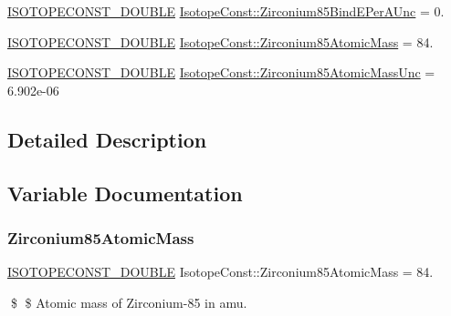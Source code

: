 \begin{DoxyCompactItemize}
\mbox{\hyperlink{group___isotope_const-_macros_ga8f45a7272ce02c0b4c65c44636ed719a}{I\+S\+O\+T\+O\+P\+E\+C\+O\+N\+S\+T\+\_\+\+D\+O\+U\+B\+LE}} \mbox{\hyperlink{group___isotope_const-_zirconium-_zr85_gab3f0654cc89cc01fb6b79367bf48fc4e}{Isotope\+Const\+::\+Zirconium85\+Bind\+E\+Per\+A\+Unc}} = 0.
\item 
\mbox{\hyperlink{group___isotope_const-_macros_ga8f45a7272ce02c0b4c65c44636ed719a}{I\+S\+O\+T\+O\+P\+E\+C\+O\+N\+S\+T\+\_\+\+D\+O\+U\+B\+LE}} \mbox{\hyperlink{group___isotope_const-_zirconium-_zr85_gad4d950173c3e64a24dbb544083a07963}{Isotope\+Const\+::\+Zirconium85\+Atomic\+Mass}} = 84.
\item 
\mbox{\hyperlink{group___isotope_const-_macros_ga8f45a7272ce02c0b4c65c44636ed719a}{I\+S\+O\+T\+O\+P\+E\+C\+O\+N\+S\+T\+\_\+\+D\+O\+U\+B\+LE}} \mbox{\hyperlink{group___isotope_const-_zirconium-_zr85_ga1dc3f7e3b3654aa1912c96c5458f4965}{Isotope\+Const\+::\+Zirconium85\+Atomic\+Mass\+Unc}} = 6.\+902e-\/06
\end{DoxyCompactItemize}


\subsection{Detailed Description}


\subsection{Variable Documentation}
\mbox{\label{group___isotope_const-_zirconium-_zr85_gad4d950173c3e64a24dbb544083a07963}} 
\subsubsection{\texorpdfstring{Zirconium85\+Atomic\+Mass}{Zirconium85AtomicMass}}
{\footnotesize\ttfamily \mbox{\hyperlink{group___isotope_const-_macros_ga8f45a7272ce02c0b4c65c44636ed719a}{I\+S\+O\+T\+O\+P\+E\+C\+O\+N\+S\+T\+\_\+\+D\+O\+U\+B\+LE}} Isotope\+Const\+::\+Zirconium85\+Atomic\+Mass = 84.}

\$ \$ Atomic mass of Zirconium-\/85 in amu. \mbox{\label{group___isotope_const-_zirconium-_zr85_ga1dc3f7e3b3654aa1912c96c5458f4965}} 
